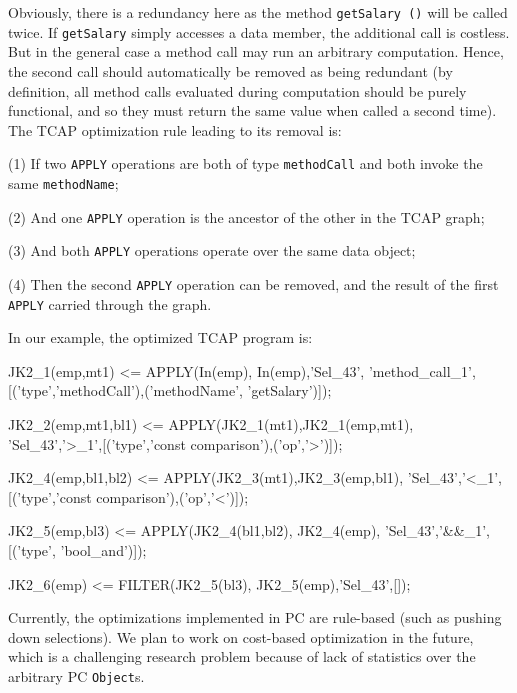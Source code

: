 Obviously, there is a redundancy here as the method \texttt{getSalary ()} will be called twice.
If \texttt{getSalary} simply accesses a data member, the additional call is costless.  But in the general case a method call may run an arbitrary
computation.  Hence, the second call should automatically be removed as being redundant 
(by definition, all method calls evaluated during computation should
be purely functional, and so they must return the same value when called a second time).
The TCAP optimization rule leading to its removal is:

\vspace{5pt}

\noindent
(1) If two \texttt{APPLY} operations are both of type \texttt{methodCall} and both invoke the same \texttt{methodName};

\noindent
(2) And one \texttt{APPLY} operation is the ancestor of the other in the TCAP graph;

\noindent
(3) And both \texttt{APPLY} operations operate over the same data object;

\noindent
(4) Then the second \texttt{APPLY} operation can be removed, and the
result of the first \texttt{APPLY} carried through the graph.

\vspace{5pt}

\noindent
In our example, the
optimized
TCAP program is:

\begin{codesmall}
JK2_1(emp,mt1) <= APPLY(In(emp), In(emp),'Sel_43', 
'method_call_1',[('type','methodCall'),('methodName',
'getSalary')]);

JK2_2(emp,mt1,bl1) <= APPLY(JK2_1(mt1),JK2_1(emp,mt1), 
'Sel_43','>_1',[('type','const comparison'),('op','>')]);

JK2_4(emp,bl1,bl2) <= APPLY(JK2_3(mt1),JK2_3(emp,bl1),
'Sel_43','<_1',[('type','const comparison'),('op','<')]);

JK2_5(emp,bl3) <= APPLY(JK2_4(bl1,bl2), JK2_4(emp), 
'Sel_43','&&_1',[('type', 'bool_and')]);

JK2_6(emp) <= FILTER(JK2_5(bl3), JK2_5(emp),'Sel_43',[]);
  
\end{codesmall}

\noindent
Currently, the optimizations implemented in PC are rule-based (such as pushing down selections).  We plan to work on cost-based optimization
in the future, which is a challenging research problem because of lack of statistics over the arbitrary PC \texttt{Object}s.
